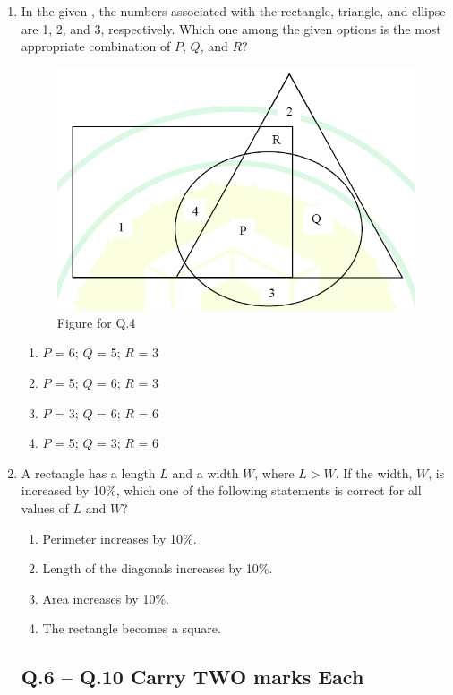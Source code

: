 \documentclass[journal]{IEEEtran}
\begin{document}
\begin{enumerate}
\item In the given , the numbers associated with the rectangle, triangle, and ellipse are 1, 2, and 3, respectively. Which one among the given options is the most appropriate combination of $P$, $Q$, and $R$?
\begin{figure}[H]
    \centering
    \includegraphics[width=0.4\columnwidth]{figs/fig1.png}
    \caption{Figure for Q.4}
    \label{fig1}
\end{figure}
\hfill{}
\begin{enumerate}
\item $P$ = 6; $Q$ = 5; $R$ = 3
\item $P$ = 5; $Q$ = 6; $R$ = 3
\item $P$ = 3; $Q$ = 6; $R$ = 6
\item $P$ = 5; $Q$ = 3; $R$ = 6
\end{enumerate}

\item A rectangle has a length $L$ and a width $W$, where $L > W$. If the width, $W$, is increased by 10\%, which one of the following statements is correct for all values of $L$ and $W$?
\hfill{}
\begin{enumerate}
\item Perimeter increases by 10\%.
\item Length of the diagonals increases by 10\%.
\item Area increases by 10\%.
\item The rectangle becomes a square.
\end{enumerate}

\subsection*{Q.6 -- Q.10 Carry TWO marks Each}


\end{enumerate}
\end{document}
